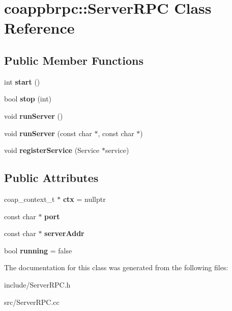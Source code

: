 \hypertarget{classcoappbrpc_1_1ServerRPC}{}\section{coappbrpc\+:\+:Server\+R\+PC Class Reference}
\label{classcoappbrpc_1_1ServerRPC}
\subsection*{Public Member Functions}
\begin{DoxyCompactItemize}
\item 
\mbox{\label{classcoappbrpc_1_1ServerRPC_a072c464fee4172a222c7168649f1209a}} 
int {\bfseries start} ()
\item 
\mbox{\label{classcoappbrpc_1_1ServerRPC_a45f18b68c2440002f7363c97f7c3a0f7}} 
bool {\bfseries stop} (int)
\item 
\mbox{\label{classcoappbrpc_1_1ServerRPC_a66cd5135dc615595a525edc5602a05aa}} 
void {\bfseries run\+Server} ()
\item 
\mbox{\label{classcoappbrpc_1_1ServerRPC_af1a6f09123293cd5aecc3a3a5e3c1c71}} 
void {\bfseries run\+Server} (const char $\ast$, const char $\ast$)
\item 
\mbox{\label{classcoappbrpc_1_1ServerRPC_ac00de68ae8663bbf8909605a1cf58d16}} 
void {\bfseries register\+Service} (Service $\ast$service)
\end{DoxyCompactItemize}
\subsection*{Public Attributes}
\begin{DoxyCompactItemize}
\item 
\mbox{\label{classcoappbrpc_1_1ServerRPC_ae94031c37f0df21b5294291e1fdfea13}} 
coap\+\_\+context\+\_\+t $\ast$ {\bfseries ctx} = nullptr
\item 
\mbox{\label{classcoappbrpc_1_1ServerRPC_a8759c90d4206df1d7902258258ebcd6d}} 
const char $\ast$ {\bfseries port}
\item 
\mbox{\label{classcoappbrpc_1_1ServerRPC_a5218f86c3535dd60c29a784e3149ecc9}} 
const char $\ast$ {\bfseries server\+Addr}
\item 
\mbox{\label{classcoappbrpc_1_1ServerRPC_a43be4159591dcb55a2559009d41389b6}} 
bool {\bfseries running} = false
\end{DoxyCompactItemize}


The documentation for this class was generated from the following files\+:\begin{DoxyCompactItemize}
\item 
include/Server\+R\+P\+C.\+h\item 
src/Server\+R\+P\+C.\+cc\end{DoxyCompactItemize}

